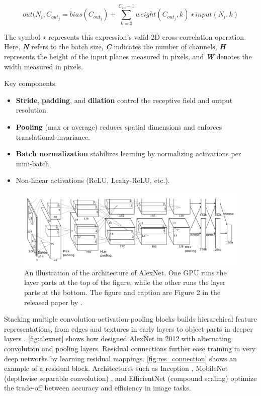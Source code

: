 \[out(N_i, C_{out_j}=bias(C_{out_j})+\sum_{k=0}^{C_{in}-1}weight(C_{out_j},k)\star input(N_i,k)\]

The symbol \(\star\) represents this expression's valid 2D cross-correlation operation. Here, \textit{\textbf{N}} refers to the batch size, \textit{\textbf{C}} indicates the number of channels, \textit{\textbf{H}} represents the height of the input planes measured in pixels, and \textit{\textbf{W}} denotes the width measured in pixels\cite{pytorch_conv2d}. 

Key components:
\begin{itemize}
    \item \textbf{Stride}, \textbf{padding}, and \textbf{dilation} control the receptive field and output resolution.
    \item \textbf{Pooling} (max or average) reduces spatial dimensions and enforces translational invariance.
    \item \textbf{Batch normalization} stabilizes learning by normalizing activations per mini-batch.
    \item Non-linear activations (ReLU, Leaky-ReLU, etc.). 
\end{itemize}

\begin{figure}
    \centering
    \includegraphics[width=1\linewidth]{figures/alexnet.png}
    \caption{An illustration of the architecture of AlexNet. One GPU runs the layer parts at the top of the figure, while the other runs the layer parts at the bottom. The figure and caption are Figure 2 in the released paper by \textcite{krizhevsky_alexnet}.}
    \label{fig:alexnet}
\end{figure}

Stacking multiple convolution-activation-pooling blocks builds hierarchical feature representations, from edges and textures in early layers to object parts in deeper layers \cite{lecun_deep_learning_2015}. \autoref{fig:alexnet} shows how \textcite{krizhevsky_alexnet} designed AlexNet in 2012 with alternating convolution and pooling layers. Residual connections \cite{he_deep_residual_2015} further ease training in very deep networks by learning residual mappings. \autoref{fig:res_connection} shows an example of a residual block. Architectures such as Inception \cite{szegedy_going_2014}, MobileNet (depthwise separable convolution) \cite{howard_mobilenets_2017}, and EfficientNet (compound scaling) \cite{tan_efficientnet_2020} optimize the trade-off between accuracy and efficiency in image tasks. 


